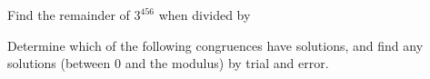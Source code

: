\begin{questions}
\question Find the remainder of $3^{456}$ when divided by

	\begin{answer}
	\end{answer}
	
	
	


\question Determine which of the following congruences have solutions, and find any solutions (between 0 and the modulus) by trial and error.
\end{questions}
